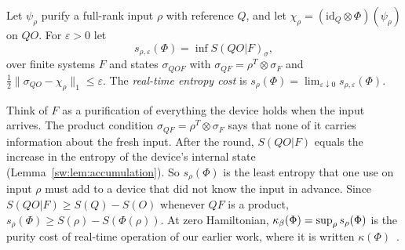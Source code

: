 \begin{definition}\label{sw:def:rtcost}
Let $\psi_\rho$ purify a full-rank input $\rho$ with reference $Q$, and let $\chi_\rho=(\mathrm{id}_Q\otimes\Phi)(\psi_\rho)$ on $QO$. For $\varepsilon>0$ let
\[
s_{\rho,\varepsilon}(\Phi)=\inf S(QO|F)_\sigma,
\]
over finite systems $F$ and states $\sigma_{QOF}$ with $\sigma_{QF}=\rho^{T}\otimes\sigma_F$ and $\tfrac12\|\sigma_{QO}-\chi_\rho\|_1\le\varepsilon$. The \emph{real-time entropy cost} is $s_\rho(\Phi)=\lim_{\varepsilon\downarrow0}s_{\rho,\varepsilon}(\Phi)$.
\end{definition}

Think of $F$ as a purification of everything the device holds when the input arrives. The product condition $\sigma_{QF}=\rho^T\otimes\sigma_F$ says that none of it carries information about the fresh input. After the round, $S(QO|F)$ equals the increase in the entropy of the device's internal state (Lemma~\ref{sw:lem:accumulation}). So $s_\rho(\Phi)$ is the least entropy that one use on input $\rho$ must add to a device that did not know the input in advance. Since $S(QO|F)\ge S(Q)-S(O)$ whenever $QF$ is a product, $s_\rho(\Phi)\ge S(\rho)-S(\Phi(\rho))$. At zero Hamiltonian, $\kappa_\beta(\Phi)=\sup_\rho s_\rho(\Phi)$ is the purity cost of real-time operation of our earlier work, where it is written $\kappa(\Phi)$~\cite{Memory,ImmediateDelivery,Douglas26closed}.


